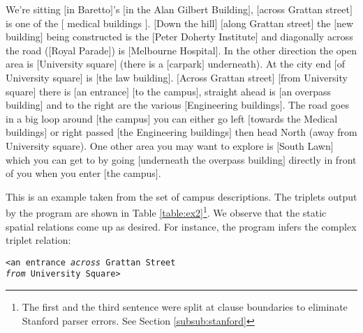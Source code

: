 \documentclass{acm_proc_article-sp}
\begin{document}
\begin{example}
\label{ex:c1}
We're sitting $[$in Baretto$]$'s $[$in the Alan Gilbert Building$]$, $[$across Grattan street$]$ is one of the $[$ medical buildings $]$. $[$Down the hill$]$ $[$along Grattan street$]$ the $[$new building$]$ being constructed is the $[$Peter Doherty Institute$]$ and diagonally across the road ($[$Royal Parade$]$) is $[$Melbourne Hospital$]$. In the other direction the open area is $[$University square$]$ (there is a $[$carpark$]$ underneath). At the city end $[$of University square$]$ is $[$the law building$]$. $[$Across Grattan street$]$ $[$from University square$]$ there is $[$an entrance$]$ $[$to the campus$]$, straight ahead is $[$an overpass building$]$ and to the right are the various $[$Engineering buildings$]$. The road goes in a big loop around $[$the campus$]$ you can either go left $[$towards the Medical buildings$]$ or right passed $[$the Engineering buildings$]$ then head North (away from University square). One other area you may want to explore is $[$South Lawn$]$ which you can get to by going $[$underneath the overpass building$]$ directly in front of you when you enter $[$the campus$]$.
\end{example}
This is an example taken from the set of campus descriptions. The triplets output by the program are shown in Table \ref{table:ex2}\footnote{The first and the third sentence were split at clause boundaries to eliminate Stanford parser errors. See Section \ref{subsub:stanford}}. We observe that the static spatial relations come up as desired. For instance, the program infers the complex triplet relation:

\texttt{<an entrance \textit{across} Grattan Street}\\ \texttt{\textit{from} University Square>} 
\end{document}
